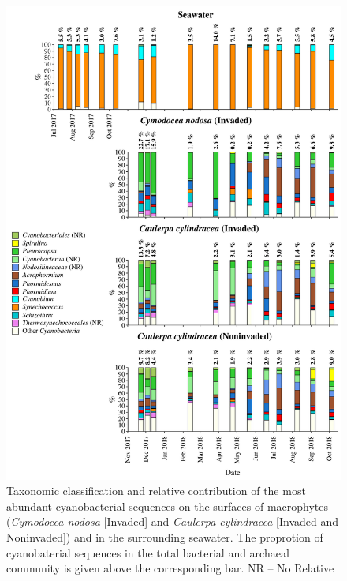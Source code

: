 \documentclass[12pt,]{article}
\begin{document}
\begin{figure}[H]

{\centering \includegraphics[width=0.85\linewidth]{../results/figures/cyanobacteria_bar_plot} 

}

\caption{Taxonomic classification and relative contribution of the most abundant cyanobacterial sequences on the surfaces of macrophytes (\textit{Cymodocea nodosa} [Invaded] and \textit{Caulerpa cylindracea} [Invaded and Noninvaded]) and in the surrounding seawater. The proprotion of cyanobaterial sequences in the total bacterial and archaeal community is given above the corresponding bar. NR -- No Relative\label{cyano}}\label{fig:unnamed-chunk-5}
\end{figure}
\end{document}
